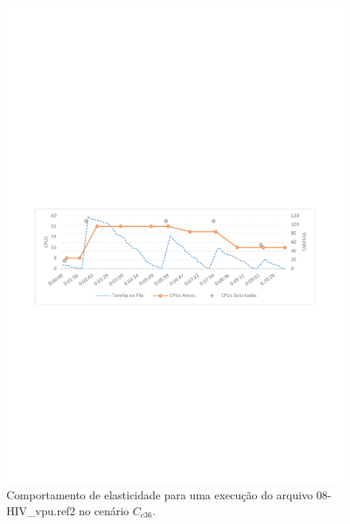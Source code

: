 \documentclass[english,brazilian]{UNISINOSmonografia} %
\begin{document}
\begin{figure}[p]
	\centering%
	\begin{minipage}{\textwidth}
		\caption{Comportamento de elasticidade para uma execução do arquivo 08-HIV\_vpu.ref2 no cenário $C_{c36}$.}
		\label{fig:results-modelo-batch-19HIV}
		\vspace{1ex}
		\includegraphics[trim=60 325 60 360,clip,width=\textwidth]{2018-12-16T11-19-00_HIV_vpu}
	\end{minipage}
\end{figure}
\end{document}
